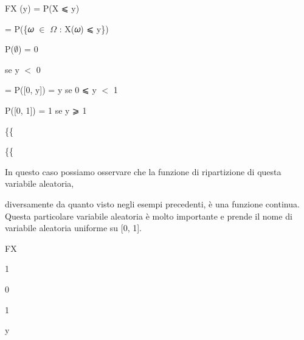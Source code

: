 \documentclass[a4paper,portrait,12pt]{article}
\begin{document}
\begin{flushleft}
FX (y) = P(X ⩽ y)
\end{flushleft}


\begin{flushleft}
= P(\{𝜔 $\in$ $\Omega$ : X(𝜔) ⩽ y\})
\end{flushleft}


\begin{flushleft}
P($\emptyset$) = 0
\end{flushleft}


\begin{flushleft}
se y $<$ 0
\end{flushleft}


\begin{flushleft}
= P([0, y]) = y se 0 ⩽ y $<$ 1
\end{flushleft}


\begin{flushleft}
P([0, 1]) = 1 se y ⩾ 1
\end{flushleft}





\{\{


\{\{





\begin{flushleft}
In questo caso possiamo osservare che la funzione di ripartizione di questa variabile aleatoria,
\end{flushleft}


\begin{flushleft}
diversamente da quanto visto negli esempi precedenti, \`{e} una funzione continua. Questa particolare variabile aleatoria \`{e} molto importante e prende il nome di variabile aleatoria uniforme su [0, 1].
\end{flushleft}


\begin{flushleft}
FX
\end{flushleft}


1





0





1





\begin{flushleft}
y
\end{flushleft}
\end{document}
